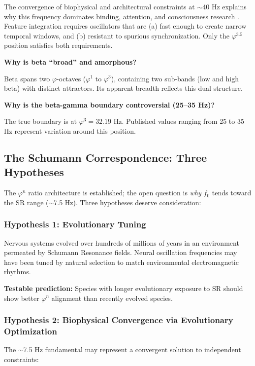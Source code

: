 \documentclass[11pt,a4paper]{article}
\newcommand{\phisym}{\varphi}
\newcommand{\fzero}{f_0}
\begin{document}
The convergence of biophysical and architectural constraints at $\sim$40 Hz explains why this frequency dominates binding, attention, and consciousness research \citep{gray1989, iaccarino2016}. Feature integration requires oscillators that are (a) fast enough to create narrow temporal windows, and (b) resistant to spurious synchronization. Only the $\phisym^{3.5}$ position satisfies both requirements.

\textbf{Why is beta ``broad'' and amorphous?}

Beta spans two $\phisym$-octaves ($\phisym^1$ to $\phisym^3$), containing two sub-bands (low and high beta) with distinct attractors. Its apparent breadth reflects this dual structure.

\textbf{Why is the beta-gamma boundary controversial (25--35 Hz)?}

The true boundary is at $\phisym^3 = 32.19$ Hz. Published values ranging from 25 to 35 Hz represent variation around this position.

\subsection{The Schumann Correspondence: Three Hypotheses}

The $\phisym^n$ ratio architecture is established; the open question is \textit{why} $\fzero$ tends toward the SR range ($\sim$7.5 Hz). Three hypotheses deserve consideration:

\subsubsection{Hypothesis 1: Evolutionary Tuning}

Nervous systems evolved over hundreds of millions of years in an environment permeated by Schumann Resonance fields. Neural oscillation frequencies may have been tuned by natural selection to match environmental electromagnetic rhythms.

\textbf{Testable prediction:} Species with longer evolutionary exposure to SR should show better $\phisym^n$ alignment than recently evolved species.

\subsubsection{Hypothesis 2: Biophysical Convergence via Evolutionary Optimization}

The $\sim$7.5 Hz fundamental may represent a convergent solution to independent constraints:
\end{document}
